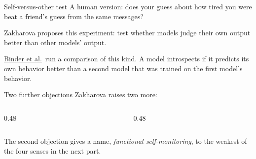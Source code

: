 \documentclass[aspectratio=169,11pt]{beamer}
\begin{document}
\begin{frame}[label=selfother]{Self-versus-other test}
A human version: does your guess about how tired you were beat a friend's guess from the same messages?

\vspace{0.5em}
\begin{center}
\end{center}

\vspace{0.5em}
Zakharova proposes this experiment: test whether models judge their own output better than other models' output.

\vspace{0.4em}
{\small \href{https://arxiv.org/abs/2410.13787}{Binder et al.}\ run a comparison of this kind. A model introspects if it predicts its own behavior better than a second model that was trained on the first model's behavior.}
\end{frame}

\begin{frame}[label=further]{Two further objections}
Zakharova raises two more:

\vspace{0.6em}
\begin{columns}[T]
\begin{column}{0.48\textwidth}
\begin{center}
\end{center}
\end{column}
\begin{column}{0.48\textwidth}
\begin{center}
\end{center}
\end{column}
\end{columns}

\vspace{0.7em}
{\small The second objection gives a name, \emph{functional self-monitoring}, to the weakest of the four senses in the next part.}
\end{frame}
\end{document}
